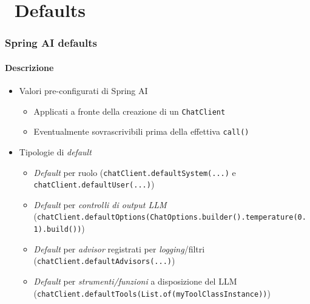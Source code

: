 \section{\faWrench\ Defaults} %
\label{sec:spring-ai-defaults}
%
\begin{frame}[t,fragile] \frametitle{Spring AI defaults}
    \framesubtitle{Descrizione}
    {\scriptsize
    \begin{itemize}[leftmargin=10pt,align=right]
        \item[\alert{\faArrowCircleRight}] Valori pre-configurati di Spring AI
        \begin{itemize}[leftmargin=10pt,align=right]
            \item[\alert{\faArrowCircleRight}] Applicati a fronte della creazione di un \texttt{ChatClient}
            \item[\alert{\faArrowCircleRight}] Eventualmente sovrascrivibili prima della effettiva \texttt{call()} 
        \end{itemize}
        \item[\alert{\faArrowCircleRight}] Tipologie di \textit{default}
        \begin{itemize}[leftmargin=10pt,align=right]
            \item[\alert{\faArrowCircleRight}] \textit{Default} per \alert{ruolo} (\texttt{chatClient.defaultSystem(...)} e \texttt{chatClient.defaultUser(...)})
            \item[\alert{\faArrowCircleRight}] \textit{Default} per \alert{\textit{controlli di \textit{output} LLM}} (\texttt{chatClient.defaultOptions(ChatOptions.builder().temperature(0.1).build())})
            \item[\alert{\faArrowCircleRight}] \textit{Default} per \alert{\textit{advisor}} registrati per \textit{logging}/filtri (\texttt{chatClient.defaultAdvisors(...)})
            \item[\alert{\faArrowCircleRight}] \textit{Default} per \alert{\textit{strumenti/funzioni}} a disposizione del LLM (\texttt{chatClient.defaultTools(List.of(myToolClassInstance))})
        \end{itemize}
    \end{itemize}
    }
\end{frame}
%
